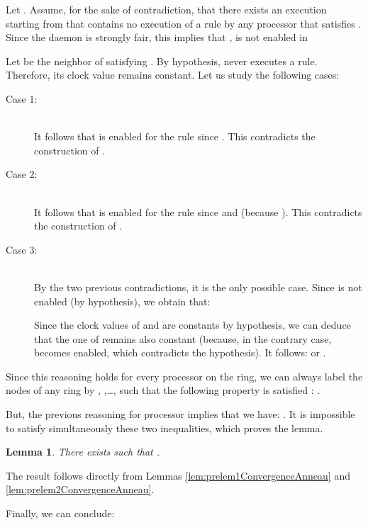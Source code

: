 \documentclass[11pt,english,letterpaper]{article}
\newtheorem{lemma}{Lemma}
\newenvironment{proof}{{\noindent\bf Proof. } }{{\hfill }}
\begin{document}
\begin{proof}
Let . Assume, for the sake of contradiction, that there exists an execution  starting from  that contains no execution of a rule by any processor	 that satisfies . Since the daemon is strongly fair, this implies that ,  is not enabled in 

Let  be the neighbor of  satisfying . By hypothesis,  never executes a rule. Therefore, its clock value remains  constant. Let us study the following cases:

\begin{description}
\item[Case 1:] \\
It follows that  is enabled for the rule  since . This contradicts the construction of .

\item[Case 2:] \\
It follows that  is enabled for the rule  since  and  (because ). This contradicts the construction of .

\item[Case 3:] \\
By the two previous contradictions, it is the only possible case. Since  is not enabled (by hypothesis), we obtain that:

Since the clock values of  and  are constants by hypothesis, we can deduce that the one of  remains also constant (because, in the contrary case,  becomes enabled, which contradicts the hypothesis). It follows:  or .
\end{description}
			
Since this reasoning holds for every processor on the ring, we can always label the nodes of any ring by , ,\ldots, such that the following property is satisfied : .

But, the previous reasoning for processor  implies that we have: . It is impossible to satisfy simultaneously these two inequalities, which proves the lemma.
\end{proof}

\begin{lemma}\label{lem:convergenceAnneau}
There exists  such that .
\end{lemma}

\begin{proof}
The result follows directly from Lemmas \ref{lem:prelem1ConvergenceAnneau} and \ref{lem:prelem2ConvergenceAnneau}.
\end{proof}
	
Finally, we can conclude:
		
\end{document}
